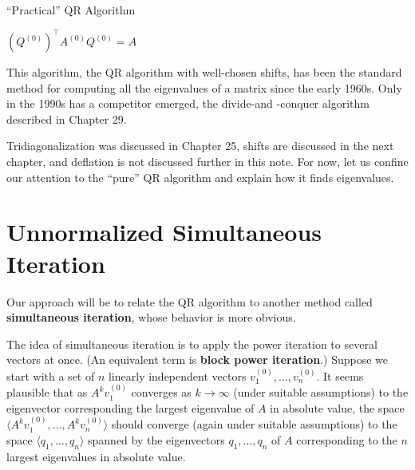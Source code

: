 \begin{algorithm}[H]
    \caption{``Practical'' QR Algorithm}
    \label{Algo 28.2}
    $ (Q^{(0)})^\top A^{(0)}Q^{(0)}=A $  
\end{algorithm}

This algorithm, the QR algorithm with well-chosen shifts, has been the standard method for computing all the eigenvalues of a matrix since the early 1960s. Only in the 1990s has a competitor emerged, the divide-and -conquer algorithm described in Chapter 29.  

Tridiagonalization was discussed in Chapter 25, shifts are discussed in the next chapter, and deflation is not discussed further in this note. For now, let us confine our attention to the ``pure'' QR algorithm and explain how it finds eigenvalues.

\section{Unnormalized Simultaneous Iteration}


Our approach will be to relate the QR algorithm to another method called \textbf{simultaneous iteration}, whose behavior is more obvious.  

The idea of simultaneous iteration is to apply the power iteration to several vectors at once. (An equivalent term is \textbf{block power iteration}.) Suppose we start with a set of $n$ linearly independent vectors $ v_1^{(0)},\ldots ,v_n^{(0)} $. It seems plausible that as $A^{k}v_1^{(0)}$ converges as $k\to \infty$ (under suitable assumptions) to the eigenvector corresponding the largest eigenvalue of $A$ in absolute value, the space $ \langle A^{k}v_1^{(0)},\ldots , A^{k}v_n^{(0)} \rangle  $ should converge (again under suitable assumptions) to the space $ \langle q_1,\ldots ,q_n \rangle  $ spanned by the eigenvectors $q_1,\ldots ,q_n$ of $A$ corresponding to the $n$ largest eigenvalues in absolute value.  

